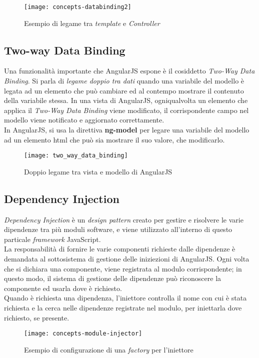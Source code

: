 \begin{figure}[!h] 
    \centering 
    \texttt{[image: concepts-databinding2]} 
    \caption{Esempio di legame tra \emph{template} e \emph{Controller}}
\end{figure}

\subsection{Two-way Data Binding}
Una funzionalità importante che AngularJS espone è il cosiddetto \emph{Two-Way Data Binding}. Si parla di \emph{legame doppio tra dati} quando una variabile del modello è legata ad un elemento che può cambiare ed al contempo mostrare il contenuto della variabile stessa. In una vista di AngularJS, ogniqualvolta un elemento che applica il \emph{Two-Way Data Binding} viene modificato, il corrispondente campo nel modello viene notificato e aggiornato correttamente.\\
In AngularJS, si usa la direttiva \textbf{ng-model} per legare una variabile del modello ad un elemento \gls{html} che può sia mostrare il suo valore, che modificarlo.

\begin{figure}[H] 
    \centering 
    \texttt{[image: two\_way\_data\_binding]} 
    \caption{Doppio legame tra vista e modello di AngularJS}
\end{figure}

\subsection{Dependency Injection}
\emph{Dependency Injection} è un \emph{design pattern} creato per gestire e risolvere le varie dipendenze tra più moduli software, e viene utilizzato all'interno di questo particale \emph{framework} JavaScript.\\
La responsabilità di fornire le varie componenti richieste dalle dipendenze è demandata al sottosistema di gestione delle iniziezioni di AngularJS. Ogni volta che si dichiara una componente, viene registrata al modulo corrispondente; in questo modo, il sistema di gestione delle dipendenze può riconoscere la componente ed usarla dove è richiesto.\\
Quando è richiesta una dipendenza, l'iniettore controlla il nome con cui è stata richiesta e la cerca nelle dipendenze registrate nel modulo, per iniettarla dove richiesto, se presente.

\begin{figure}[!h] 
    \centering 
    \texttt{[image: concepts-module-injector]} 
    \caption{Esempio di configurazione di una \emph{factory} per l'iniettore}
\end{figure}

